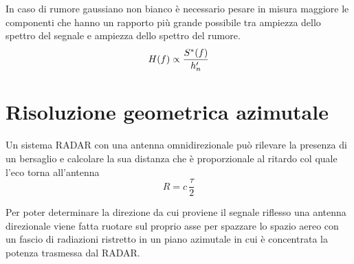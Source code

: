 In caso di rumore gaussiano non bianco è necessario pesare in misura maggiore le componenti che hanno un rapporto più grande possibile tra ampiezza dello spettro del segnale e ampiezza dello spettro del rumore.
\begin{equation}
H(f)\propto\frac{{S}^\ast(f)}{h'_n}
\label{eq:radar_filtro_adattato_rumore_colorato}
\end{equation}

\section{Risoluzione geometrica azimutale}
Un sistema \ac{RADAR} con una antenna omnidirezionale può rilevare la presenza di un bersaglio e calcolare la sua distanza che è proporzionale al ritardo col quale l'eco torna all'antenna
\begin{equation}
R=c\,\frac{\tau}{2}
\end{equation}

Per poter determinare la direzione da cui proviene il segnale riflesso una antenna direzionale viene fatta ruotare sul proprio asse per spazzare lo spazio aereo con un fascio di radiazioni ristretto in un piano azimutale in cui è concentrata la potenza trasmessa dal \ac{RADAR}.

